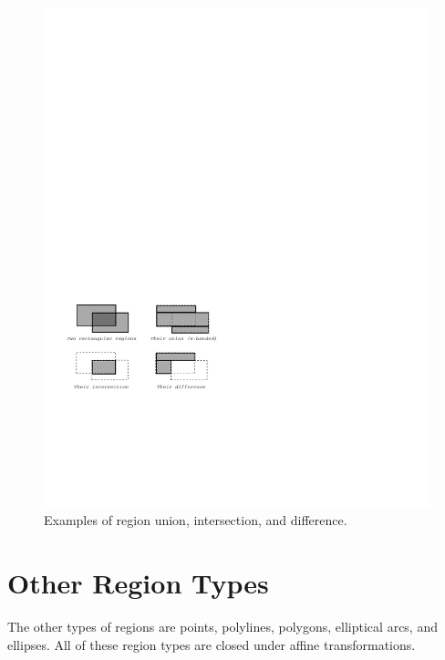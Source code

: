 \begin{figure}
\centerline{\includegraphics{region-composition}}
\caption{Examples of region union, intersection, and difference.}
\end{figure}


\section {Other Region Types}

The other types of regions are points, polylines, polygons, elliptical arcs, and
ellipses.  All of these region types are closed under affine transformations.

